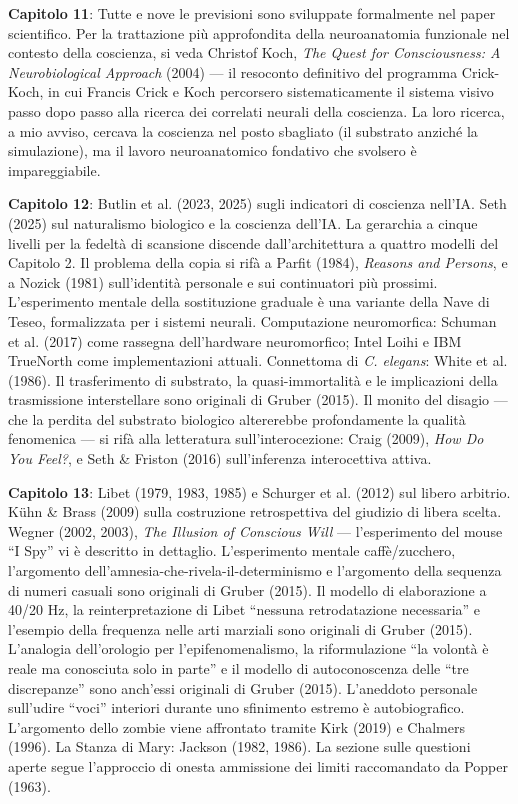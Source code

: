 \documentclass[11pt, twoside, openright]{book}
\begin{document}
\textbf{Capitolo 11}: Tutte e nove le previsioni sono sviluppate formalmente nel paper scientifico. Per la trattazione più approfondita della neuroanatomia funzionale nel contesto della coscienza, si veda Christof Koch, \textit{The Quest for Consciousness: A Neurobiological Approach} (2004) --- il resoconto definitivo del programma Crick-Koch, in cui Francis Crick e Koch percorsero sistematicamente il sistema visivo passo dopo passo alla ricerca dei correlati neurali della coscienza. La loro ricerca, a mio avviso, cercava la coscienza nel posto sbagliato (il substrato anziché la simulazione), ma il lavoro neuroanatomico fondativo che svolsero è impareggiabile.

\textbf{Capitolo 12}: Butlin et al. (2023, 2025) sugli indicatori di coscienza nell'IA. Seth (2025) sul naturalismo biologico e la coscienza dell'IA. La gerarchia a cinque livelli per la fedeltà di scansione discende dall'architettura a quattro modelli del Capitolo 2. Il problema della copia si rifà a Parfit (1984), \textit{Reasons and Persons}, e a Nozick (1981) sull'identità personale e sui continuatori più prossimi. L'esperimento mentale della sostituzione graduale è una variante della Nave di Teseo, formalizzata per i sistemi neurali. Computazione neuromorfica: Schuman et al. (2017) come rassegna dell'hardware neuromorfico; Intel Loihi e IBM TrueNorth come implementazioni attuali. Connettoma di \textit{C. elegans}: White et al. (1986). Il trasferimento di substrato, la quasi-immortalità e le implicazioni della trasmissione interstellare sono originali di Gruber (2015). Il monito del disagio --- che la perdita del substrato biologico altererebbe profondamente la qualità fenomenica --- si rifà alla letteratura sull'interocezione: Craig (2009), \textit{How Do You Feel?}, e Seth \& Friston (2016) sull'inferenza interocettiva attiva.

\textbf{Capitolo 13}: Libet (1979, 1983, 1985) e Schurger et al. (2012) sul libero arbitrio. Kühn \& Brass (2009) sulla costruzione retrospettiva del giudizio di libera scelta. Wegner (2002, 2003), \textit{The Illusion of Conscious Will} --- l'esperimento del mouse ``I Spy'' vi è descritto in dettaglio. L'esperimento mentale caffè/\allowbreak{}zucchero, l'argomento dell'amnesia-che-rivela-il-determinismo e l'argomento della sequenza di numeri casuali sono originali di Gruber (2015). Il modello di elaborazione a 40/\allowbreak{}20 Hz, la reinterpretazione di Libet ``nessuna retrodatazione necessaria'' e l'esempio della frequenza nelle arti marziali sono originali di Gruber (2015). L'analogia dell'orologio per l'epifenomenalismo, la riformulazione ``la volontà è reale ma conosciuta solo in parte'' e il modello di autoconoscenza delle ``tre discrepanze'' sono anch'essi originali di Gruber (2015). L'aneddoto personale sull'udire ``voci'' interiori durante uno sfinimento estremo è autobiografico. L'argomento dello zombie viene affrontato tramite Kirk (2019) e Chalmers (1996). La Stanza di Mary: Jackson (1982, 1986). La sezione sulle questioni aperte segue l'approccio di onesta ammissione dei limiti raccomandato da Popper (1963).
\end{document}
